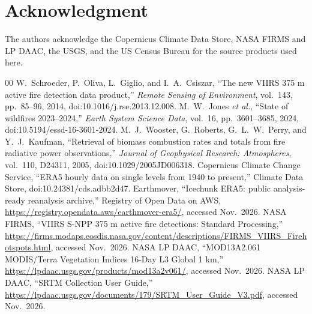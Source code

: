\documentclass[conference]{IEEEtran}
\begin{document}
\section*{Acknowledgment}
The authors acknowledge the Copernicus Climate Data Store, NASA FIRMS and LP DAAC, the USGS, and the US Census Bureau for the source products used here.

\begin{thebibliography}{00}
 W.~Schroeder, P.~Oliva, L.~Giglio, and I.~A.~Csiszar, ``The new VIIRS 375 m active fire detection data product,'' \emph{Remote Sensing of Environment}, vol.~143, pp.~85--96, 2014, doi:10.1016/j.rse.2013.12.008.
 M.~W.~Jones \emph{et al.}, ``State of wildfires 2023--2024,'' \emph{Earth System Science Data}, vol.~16, pp.~3601--3685, 2024, doi:10.5194/essd-16-3601-2024.
 M.~J.~Wooster, G.~Roberts, G.~L.~W.~Perry, and Y.~J.~Kaufman, ``Retrieval of biomass combustion rates and totals from fire radiative power observations,'' \emph{Journal of Geophysical Research: Atmospheres}, vol.~110, D24311, 2005, doi:10.1029/2005JD006318.
 Copernicus Climate Change Service, ``ERA5 hourly data on single levels from 1940 to present,'' Climate Data Store, doi:10.24381/cds.adbb2d47.
 Earthmover, ``Icechunk ERA5: public analysis-ready reanalysis archive,'' Registry of Open Data on AWS, \url{https://registry.opendata.aws/earthmover-era5/}, accessed Nov.~2026.
 NASA FIRMS, ``VIIRS S-NPP 375 m active fire detections: Standard Processing,'' \url{https://firms.modaps.eosdis.nasa.gov/content/descriptions/FIRMS_VIIRS_Firehotspots.html}, accessed Nov.~2026.
 NASA LP DAAC, ``MOD13A2.061 MODIS/Terra Vegetation Indices 16-Day L3 Global 1 km,'' \url{https://lpdaac.usgs.gov/products/mod13a2v061/}, accessed Nov.~2026.
 NASA LP DAAC, ``SRTM Collection User Guide,'' \url{https://lpdaac.usgs.gov/documents/179/SRTM_User_Guide_V3.pdf}, accessed Nov.~2026.
\end{thebibliography}
\end{document}
